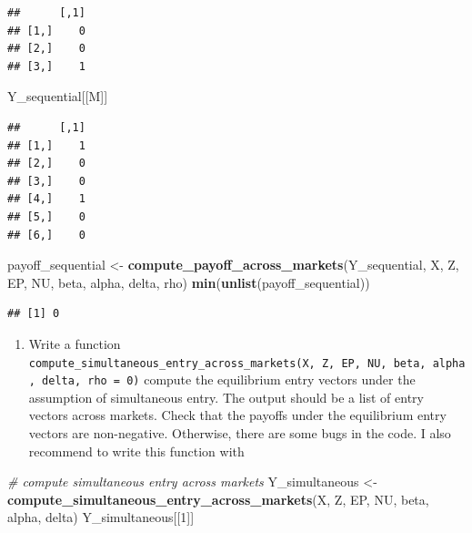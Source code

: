 \documentclass[]{book}
\newenvironment{Shaded}{\begin{snugshade}}{\end{snugshade}}
\newcommand{\KeywordTok}[1]{\textcolor[rgb]{0.13,0.29,0.53}{\textbf{#1}}}
\newcommand{\DecValTok}[1]{\textcolor[rgb]{0.00,0.00,0.81}{#1}}
\newcommand{\StringTok}[1]{\textcolor[rgb]{0.31,0.60,0.02}{#1}}
\newcommand{\CommentTok}[1]{\textcolor[rgb]{0.56,0.35,0.01}{\textit{#1}}}
\newcommand{\NormalTok}[1]{#1}
\providecommand{\tightlist}{%
  \setlength{\itemsep}{0pt}\setlength{\parskip}{0pt}}
\begin{document}
\begin{verbatim}
##      [,1]
## [1,]    0
## [2,]    0
## [3,]    1
\end{verbatim}

\begin{Shaded}
\begin{Highlighting}[]
\NormalTok{Y_sequential[[M]]}
\end{Highlighting}
\end{Shaded}

\begin{verbatim}
##      [,1]
## [1,]    1
## [2,]    0
## [3,]    0
## [4,]    1
## [5,]    0
## [6,]    0
\end{verbatim}

\begin{Shaded}
\begin{Highlighting}[]
\NormalTok{payoff_sequential <-}
\StringTok{  }\KeywordTok{compute_payoff_across_markets}\NormalTok{(Y_sequential, X, Z, EP, NU, beta, alpha, delta, rho)}
\KeywordTok{min}\NormalTok{(}\KeywordTok{unlist}\NormalTok{(payoff_sequential))}
\end{Highlighting}
\end{Shaded}

\begin{verbatim}
## [1] 0
\end{verbatim}

\begin{enumerate}
\def\labelenumi{\arabic{enumi}.}
\setcounter{enumi}{7}
\tightlist
\item
  Write a function
  \texttt{compute\_simultaneous\_entry\_across\_markets(X,\ Z,\ EP,\ NU,\ beta,\ alpha,\ delta,\ rho\ =\ 0)}
  compute the equilibrium entry vectors under the assumption of
  simultaneous entry. The output should be a list of entry vectors
  across markets. Check that the payoffs under the equilibrium entry
  vectors are non-negative. Otherwise, there are some bugs in the code.
  I also recommend to write this function with
\end{enumerate}

\begin{Shaded}
\begin{Highlighting}[]
\CommentTok{# compute simultaneous entry across markets}
\NormalTok{Y_simultaneous <-}
\StringTok{  }\KeywordTok{compute_simultaneous_entry_across_markets}\NormalTok{(X, Z, EP, NU, beta, alpha, delta)}
\NormalTok{Y_simultaneous[[}\DecValTok{1}\NormalTok{]]}
\end{Highlighting}
\end{Shaded}
\end{document}
